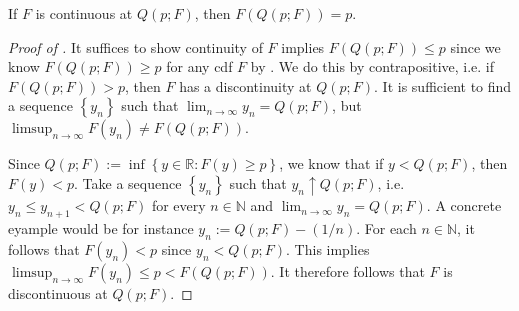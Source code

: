 \begin{lemma}
\label{lem--FQp-equal-p-continuity}
If \(F\) is continuous at \(Q (p; F)\), then \(F (Q (p; F)) = p\).
\end{lemma}

\begin{proof}[Proof of ]
It suffices to show continuity of \(F\) implies \(F (Q (p; F)) \leq p\) since
we know \(F (Q (p; F)) \geq p\) for any cdf \(F\) by .
We do this by contrapositive, i.e. if \(F (Q (p; F)) > p\),
then \(F\) has a discontinuity at \(Q (p; F)\).
It is sufficient to find a sequence \(\left\{ y_{n} \right\}\) such that
\(\lim_{n \to \infty} y_{n} = Q (p; F)\), but \(\limsup_{n \to \infty} F
\left( y_{n} \right) \neq F (Q (p; F))\).

Since \(Q (p; F) := \inf \left\{ y \in \mathbb{R} : F (y) \geq p
\right\}\), we know that if \(y < Q (p; F)\), then \(F (y) < p\).
Take a sequence \(\left\{ y_{n} \right\}\) such that \(y_{n} \uparrow Q (p;
F)\), i.e. \(y_{n} \leq y_{n + 1} < Q (p; F)\) for every \(n \in \mathbb{N}\)
and \(\lim_{n \to \infty} y_{n} = Q (p; F)\).
A concrete eyample would be for instance \(y_{n} := Q (p; F) - (1 / n)\).
For each \(n \in \mathbb{N}\), it follows that \(F \left( y_{n} \right) < p\)
since \(y_{n} < Q (p; F)\).
This implies \(\limsup_{n \to \infty} F \left( y_{n} \right) \leq p < F (Q (p;
F))\).
It therefore follows that \(F\) is discontinuous at \(Q (p; F)\).
\end{proof}



